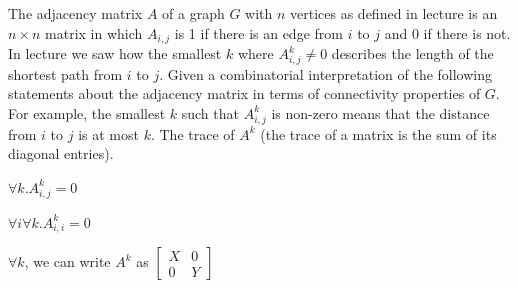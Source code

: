 \documentclass[12pt,twoside]{article}
\begin{document}
\begin{problem}{20}
    The adjacency matrix $A$ of a graph $G$ with $n$ vertices as defined in lecture is an $n \times n$
    matrix in which $A_{i,j}$ is 1 if there is an edge from $i$ to $j$ and 0 if there is not.
    In lecture we saw how 
    the smallest $k$ where $A^k_{i,j} \neq 0$ describes the length
    of the shortest path from $i$ to $j$. Given a combinatorial interpretation of the following statements about the adjacency matrix in terms of connectivity properties of $G$. For example, the smallest $k$ such that $A^k_{i,j}$ is non-zero means that the distance from $i$ to $j$ is at most $k$. 
\bparts
{}
    The trace of $A^{k}$ (the trace of a matrix is the sum of its diagonal entries).

    $\forall k. A^{k}_{i,j} = 0$

    $\forall i \forall k. A^{k}_{i,i} = 0$

$\forall k$, we can write $A^k$ as $\left[ \begin{array}{cc}
                                            X & 0 \\
                                            0 & Y 
                                    \end{array} \right]$

\eparts
\end{problem}
\end{document}
